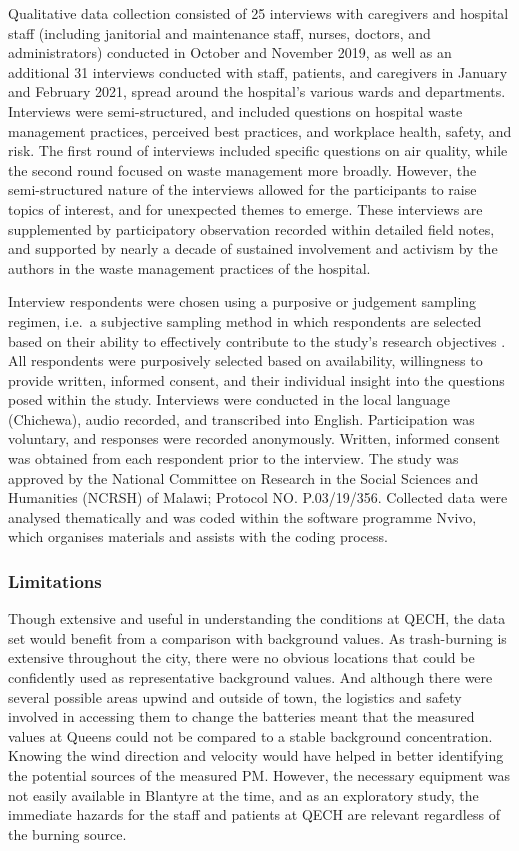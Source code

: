 \documentclass[
  authoryear,
  review,
  3p]{elsarticle}
\begin{document}
Qualitative data collection consisted of 25 interviews with caregivers
and hospital staff (including janitorial and maintenance staff, nurses,
doctors, and administrators) conducted in October and November 2019, as
well as an additional 31 interviews conducted with staff, patients, and
caregivers in January and February 2021, spread around the hospital's
various wards and departments. Interviews were semi-structured, and
included questions on hospital waste management practices, perceived
best practices, and workplace health, safety, and risk. The first round
of interviews included specific questions on air quality, while the
second round focused on waste management more broadly. However, the
semi-structured nature of the interviews allowed for the participants to
raise topics of interest, and for unexpected themes to emerge. These
interviews are supplemented by participatory observation recorded within
detailed field notes, and supported by nearly a decade of sustained
involvement and activism by the authors in the waste management
practices of the hospital.

Interview respondents were chosen using a purposive or judgement
sampling regimen, i.e.~a subjective sampling method in which respondents
are selected based on their ability to effectively contribute to the
study's research objectives \citep{kitchin2013conducting}. All
respondents were purposively selected based on availability, willingness
to provide written, informed consent, and their individual insight into
the questions posed within the study. Interviews were conducted in the
local language (Chichewa), audio recorded, and transcribed into English.
Participation was voluntary, and responses were recorded anonymously.
Written, informed consent was obtained from each respondent prior to the
interview. The study was approved by the National Committee on Research
in the Social Sciences and Humanities (NCRSH) of Malawi; Protocol NO.
P.03/19/356. Collected data were analysed thematically and was coded
within the software programme Nvivo, which organises materials and
assists with the coding process.

\hypertarget{limitations}{%
\subsubsection{Limitations}\label{limitations}}

Though extensive and useful in understanding the conditions at QECH, the
data set would benefit from a comparison with background values. As
trash-burning is extensive throughout the city, there were no obvious
locations that could be confidently used as representative background
values. And although there were several possible areas upwind and
outside of town, the logistics and safety involved in accessing them to
change the batteries meant that the measured values at Queens could not
be compared to a stable background concentration. Knowing the wind
direction and velocity would have helped in better identifying the
potential sources of the measured PM. However, the necessary equipment
was not easily available in Blantyre at the time, and as an exploratory
study, the immediate hazards for the staff and patients at QECH are
relevant regardless of the burning source.
\end{document}
